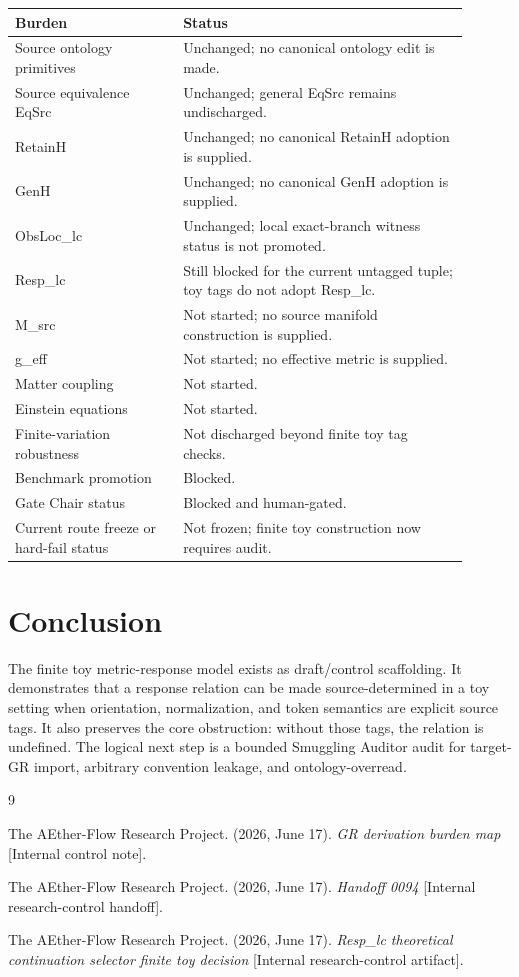 \documentclass[11pt]{article}
\begin{document}
\begin{center}
\begin{tabular}{p{0.33\linewidth}p{0.57\linewidth}}
\hline
Burden & Status \\
\hline
Source ontology primitives & Unchanged; no canonical ontology edit is made. \\
Source equivalence EqSrc & Unchanged; general EqSrc remains undischarged. \\
RetainH & Unchanged; no canonical RetainH adoption is supplied. \\
GenH & Unchanged; no canonical GenH adoption is supplied. \\
ObsLoc\_lc & Unchanged; local exact-branch witness status is not promoted. \\
Resp\_lc & Still blocked for the current untagged tuple; toy tags do not adopt Resp\_lc. \\
M\_src & Not started; no source manifold construction is supplied. \\
g\_eff & Not started; no effective metric is supplied. \\
Matter coupling & Not started. \\
Einstein equations & Not started. \\
Finite-variation robustness & Not discharged beyond finite toy tag checks. \\
Benchmark promotion & Blocked. \\
Gate Chair status & Blocked and human-gated. \\
Current route freeze or hard-fail status & Not frozen; finite toy construction now requires audit. \\
\hline
\end{tabular}
\end{center}

\section{Conclusion}

The finite toy metric-response model exists as draft/control
scaffolding. It demonstrates that a response relation can be made
source-determined in a toy setting when orientation, normalization, and
token semantics are explicit source tags. It also preserves the core
obstruction: without those tags, the relation is undefined. The logical
next step is a bounded Smuggling Auditor audit for target-GR import,
arbitrary convention leakage, and ontology-overread.

\begin{thebibliography}{9}

The AEther-Flow Research Project. (2026, June 17). \emph{GR derivation
burden map} [Internal control note].

The AEther-Flow Research Project. (2026, June 17). \emph{Handoff 0094}
[Internal research-control handoff].

The AEther-Flow Research Project. (2026, June 17). \emph{Resp\_lc
theoretical continuation selector finite toy decision} [Internal
research-control artifact].

\end{thebibliography}
\end{document}
